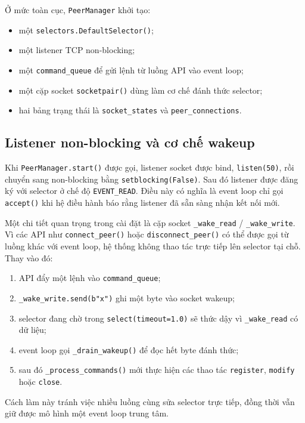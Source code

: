 Ở mức toàn cục, \texttt{PeerManager} khởi tạo:
\begin{itemize}[leftmargin=2em]
    \item một \texttt{selectors.DefaultSelector()};
    \item một listener TCP non-blocking;
    \item một \texttt{command\_queue} để gửi lệnh từ luồng API vào event loop;
    \item một cặp socket \texttt{socketpair()} dùng làm cơ chế đánh thức selector;
    \item hai bảng trạng thái là \texttt{socket\_states} và \texttt{peer\_connections}.
\end{itemize}

\subsection{Listener non-blocking và cơ chế wakeup}
Khi \texttt{PeerManager.start()} được gọi, listener socket được bind, \texttt{listen(50)}, rồi chuyển sang non-blocking bằng \texttt{setblocking(False)}. Sau đó listener được đăng ký với selector ở chế độ \texttt{EVENT\_READ}. Điều này có nghĩa là event loop chỉ gọi \texttt{accept()} khi hệ điều hành báo rằng listener đã sẵn sàng nhận kết nối mới.

Một chi tiết quan trọng trong cài đặt là cặp socket \texttt{\_wake\_read} / \texttt{\_wake\_write}. Vì các API như \texttt{connect\_peer()} hoặc \texttt{disconnect\_peer()} có thể được gọi từ luồng khác với event loop, hệ thống không thao tác trực tiếp lên selector tại chỗ. Thay vào đó:
\begin{enumerate}[leftmargin=2em]
    \item API đẩy một lệnh vào \texttt{command\_queue};
    \item \texttt{\_wake\_write.send(b"x")} ghi một byte vào socket wakeup;
    \item selector đang chờ trong \texttt{select(timeout=1.0)} sẽ thức dậy vì \texttt{\_wake\_read} có dữ liệu;
    \item event loop gọi \texttt{\_drain\_wakeup()} để đọc hết byte đánh thức;
    \item sau đó \texttt{\_process\_commands()} mới thực hiện các thao tác \texttt{register}, \texttt{modify} hoặc \texttt{close}.
\end{enumerate}

Cách làm này tránh việc nhiều luồng cùng sửa selector trực tiếp, đồng thời vẫn giữ được mô hình một event loop trung tâm.

